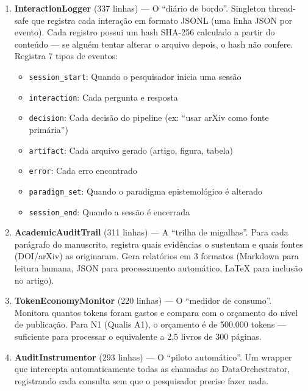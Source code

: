 \documentclass[12pt,a4paper]{article}
\begin{document}
\begin{enumerate}[itemsep=2pt]
  \item \textbf{InteractionLogger} (337 linhas) --- O ``diário de bordo''. Singleton thread-safe que registra cada interação em formato JSONL (uma linha JSON por evento). Cada registro possui um hash SHA-256 calculado a partir do conteúdo --- se alguém tentar alterar o arquivo depois, o hash não confere. Registra 7 tipos de eventos:
  \begin{itemize}
    \item \texttt{session\_start}: Quando o pesquisador inicia uma sessão
    \item \texttt{interaction}: Cada pergunta e resposta
    \item \texttt{decision}: Cada decisão do pipeline (ex: ``usar arXiv como fonte primária'')
    \item \texttt{artifact}: Cada arquivo gerado (artigo, figura, tabela)
    \item \texttt{error}: Cada erro encontrado
    \item \texttt{paradigm\_set}: Quando o paradigma epistemológico é alterado
    \item \texttt{session\_end}: Quando a sessão é encerrada
  \end{itemize}

  \item \textbf{AcademicAuditTrail} (311 linhas) --- A ``trilha de migalhas''. Para cada parágrafo do manuscrito, registra quais evidências o sustentam e quais fontes (DOI/arXiv) as originaram. Gera relatórios em 3 formatos (Markdown para leitura humana, JSON para processamento automático, LaTeX para inclusão no artigo).

  \item \textbf{TokenEconomyMonitor} (220 linhas) --- O ``medidor de consumo''. Monitora quantos tokens foram gastos e compara com o orçamento do nível de publicação. Para N1 (Qualis A1), o orçamento é de 500.000 tokens --- suficiente para processar o equivalente a 2,5 livros de 300 páginas.

  \item \textbf{AuditInstrumentor} (293 linhas) --- O ``piloto automático''. Um wrapper que intercepta automaticamente todas as chamadas ao DataOrchestrator, registrando cada consulta sem que o pesquisador precise fazer nada.


\end{enumerate}
\end{document}
